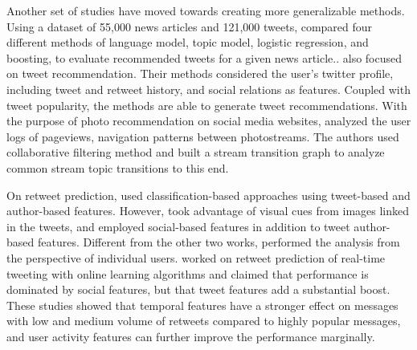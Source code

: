 Another set of studies have moved towards creating more generalizable methods. Using a dataset of 55,000 news articles and 121,000 tweets, \cite{Krestel} compared four different methods of language model, topic model, logistic regression, and boosting, to evaluate recommended tweets for a given news article.. \cite{Yan,chen} also focused on tweet recommendation. Their methods considered the user’s twitter profile, including tweet and retweet history, and social relations as features. Coupled with tweet popularity, the methods are able to generate tweet recommendations. With the purpose of photo recommendation on social media websites, \cite{chiarandini} analyzed the user logs of pageviews, navigation patterns between photostreams. The authors used collaborative filtering method and built a stream transition graph to analyze common stream topic transitions to this end.

On retweet prediction, \cite{can,xu,petrovicOsborne} used classification-based approaches using tweet-based and author-based features. However, \cite{can} took advantage of visual cues from images linked in the tweets, and \cite{xu} employed social-based features in addition to tweet author-based features. Different from the other two works, \cite{xu} performed the analysis from the perspective of individual users. \cite{petrovicOsborne} worked on retweet prediction of real-time tweeting with online learning algorithms and claimed that performance is dominated by social features, but that tweet features add a substantial boost. These studies showed that temporal features have a stronger effect on messages with low and medium volume of retweets compared to highly popular messages, and user activity features can further improve the performance marginally.

